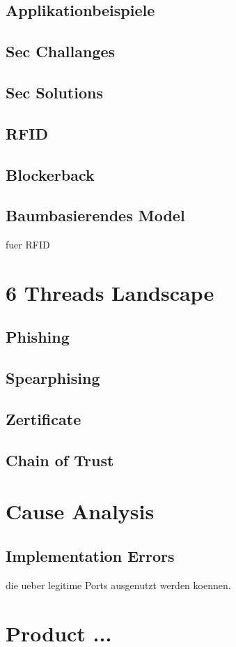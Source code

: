 \documentclass[a4paper, 12pt]{article}
\begin{document}
\subsection{Applikationbeispiele}
\subsection{Sec Challanges}
\subsection{Sec Solutions}
\subsection{RFID}
\subsection{Blockerback}
\subsection{Baumbasierendes Model}
fuer RFID
\section{6 Threads Landscape}
\subsection{Phishing}
\subsection{Spearphising}
\subsection{Zertificate}
\subsection{Chain of Trust}

\section{Cause Analysis}
\subsection{Implementation Errors}
die ueber legitime Ports ausgenutzt werden koennen.

\section{Product ...}
\end{document}
